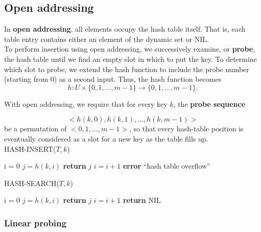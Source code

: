 \documentclass[12pt]{article}
\begin{document}
\subsection{Open addressing}

In \textbf {open addressing}, all elements occupy the hash table itself. That is, each table entry contains either an element of the dynamic set or NIL. \\

To perform insertion using open addressing, we successively examine, or \textbf {probe}, the hash table until we find an empty slot in which to put the key. To determine which slot to probe, we extend the hash function to include the probe number (starting from 0) as a second input. Thus, the hash function becomes
\begin{equation*}
  h: U \times \{ 0,1,\dots,m-1 \} \rightarrow \{ 0,1,\dots,m-1 \}.
\end{equation*}

With open addressing, we require that for every key $k$, the \textbf {probe sequence}

\begin{equation*}
  <h(k,0), h(k,1), \dots, h(k, m-1)>
\end{equation*}
be a permutation of $<0,1,\dots,m-1>$, so that every hash-table position is eventually considered as a slot for a new key as the table fills up. \\

HASH-INSERT($T, k$)
\begin{algorithmic}[1]
\State i = 0
\Repeat
	\State $j = h(k,i)$
                \State \textbf {return} $j$
        \Else
        	\State $i = i + 1$
        \EndIf
{}
\State \textbf {error} ``hash table overflow''
\end{algorithmic}

HASH-SEARCH($T, k$)
\begin{algorithmic}[1]
\State i = 0
\Repeat
	\State $j = h(k,i)$
                \State \textbf {return} $j$
        \EndIf
        \State $i = i + 1$
\State \textbf {return} NIL
\end{algorithmic}

\subsubsection*{Linear probing}
\end{document}
